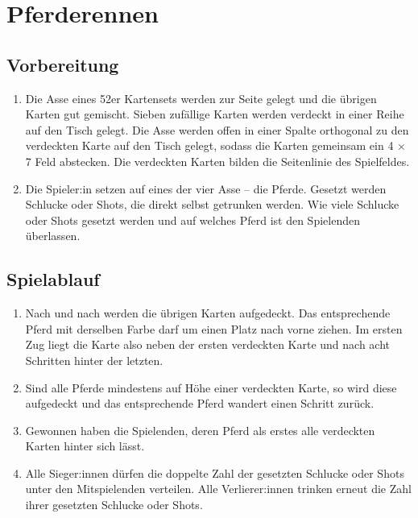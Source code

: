 \chapter{Pferderennen}
\section{Vorbereitung}
\begin{enumerate}[label={(\arabic*)}]    
    \item
    Die Asse eines 52er Kartensets werden zur Seite gelegt und die übrigen Karten gut gemischt.
    Sieben zufällige Karten werden verdeckt in einer Reihe auf den Tisch gelegt.
    Die Asse werden offen in einer Spalte orthogonal zu den verdeckten Karte auf den Tisch gelegt, sodass die Karten gemeinsam ein 4 \begin{math}\times\end{math} 7 Feld abstecken.
    Die verdeckten Karten bilden die Seitenlinie des Spielfeldes.

    \item
    Die Spieler:in setzen auf eines der vier Asse – die \glqq{}Pferde\grqq{}.
    Gesetzt werden Schlucke oder Shots, die direkt selbst getrunken werden.
    Wie viele Schlucke oder Shots gesetzt werden und auf welches Pferd ist den Spielenden überlassen.
\end{enumerate}

\section{Spielablauf}
\begin{enumerate}[label={(\arabic*)}]
    \item
    Nach und nach werden die übrigen Karten aufgedeckt.
    Das entsprechende Pferd mit derselben Farbe darf um einen Platz nach vorne ziehen.
    Im ersten Zug liegt die Karte also neben der ersten verdeckten Karte und nach acht Schritten hinter der letzten.

    \item
    Sind alle Pferde mindestens auf Höhe einer verdeckten Karte, so wird diese aufgedeckt und das entsprechende Pferd wandert einen Schritt zurück.

    \item
    Gewonnen haben die Spielenden, deren Pferd als erstes alle verdeckten Karten hinter sich lässt.

    \item
    Alle Sieger:innen dürfen die doppelte Zahl der gesetzten Schlucke oder Shots unter den Mitspielenden verteilen.
    Alle Verlierer:innen trinken erneut die Zahl ihrer gesetzten Schlucke oder Shots.
\end{enumerate}
